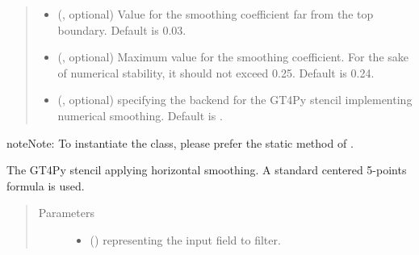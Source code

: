 \documentclass[letterpaper,10pt,english]{sphinxmanual}
\begin{document}
\begin{fulllineitems}
\begin{fulllineitems}
\begin{quote}
\begin{description}
\begin{itemize}
\item {} 
 (, optional) \textendash{} Value for the smoothing coefficient far from the top boundary. Default is 0.03.

\item {} 
 (, optional) \textendash{} Maximum value for the smoothing coefficient. For the sake of numerical stability, it should not
exceed 0.25. Default is 0.24.

\item {} 
 (, optional) \textendash{}  specifying the backend for the GT4Py stencil implementing numerical
smoothing. Default is .

\end{itemize}

\end{description}\end{quote}

\begin{sphinxadmonition}{note}{Note:}
To instantiate the class, please prefer the static method
{\hyperref[\detokenize{api:tasmania.dycore.horizontal_smoothing.HorizontalSmoothing.factory}]{}}
of {\hyperref[\detokenize{api:tasmania.dycore.horizontal_smoothing.HorizontalSmoothing}]{}}.
\end{sphinxadmonition}

\end{fulllineitems}


\begin{fulllineitems}
\label{\detokenize{api:tasmania.dycore.horizontal_smoothing.HorizontalSmoothingSecondOrderXYZ._stencil_defs}}
The GT4Py stencil applying horizontal smoothing. A standard centered 5-points formula is used.
\begin{quote}\begin{description}
\item[{Parameters}] \leavevmode\begin{itemize}
\item {} 
 () \textendash{}  representing the input field to filter.


\end{itemize}
\end{description}
\end{quote}
\end{fulllineitems}
\end{fulllineitems}
\end{document}
